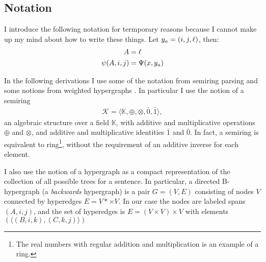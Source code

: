 \subsection{Notation}
I introduce the following notation for termporary reasons because I cannot make up my mind about how to write these things. Let $y_a = (i, j, \ell)$, then:
\begin{align*}
  A &= \ell  \\
  \psi(A, i, j) &= \Psi(x, y_a)
\end{align*}

In the following derivations I use some of the notation from semiring parsing \citep{goodman1999semiring,eisner2009semirings} and some notions from weighted hypergraphs \citep{gallo1993directed,klein2004parsing}. In particular I use the notion of a semiring
\begin{align*}
  \mathcal{K} = \langle \mathbb{K}, \oplus, \otimes, \bar{0}, \bar{1} \rangle,
\end{align*}
an algebraic structure over a field $\mathbb{K}$, with additive and multiplicative operations $\oplus$ and $\otimes$, and additive and multiplicative identities $\bar{1}$ and $\bar{0}$. In fact, a semiring  is equivalent to ring\footnote{The real numbers with regular addition and multiplication is an example of a ring.}, without the requirement of an additive inverse for each element.

I also use the notion of a hypergraph as a compact representation of the collection of all possible trees for a sentence. In particular, a directed B-hypergraph (a \textit{backwards} hypergraph) is a pair $G = (V, E)$ consisting of nodes $V$ connected by hyperedges $E = V* \times V$. In our case the nodes are labeled spans $(A, i, j)$, and the set of hyperedges is $E = (V \times V) \times V$ with elements $(\langle (B, i, k), (C, k, j) \rangle )$




